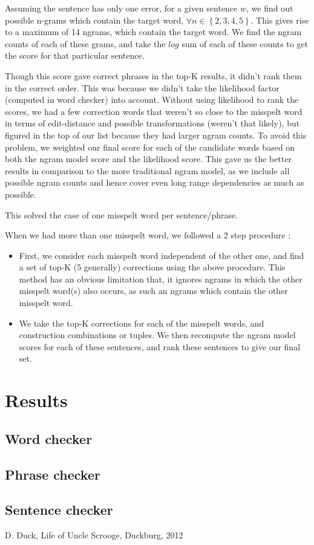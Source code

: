 Assuming the sentence has only one error, for a given sentence $w$, we find out possible n-grams which contain the target word, $\forall n \in \left\lbrace 2,3,4,5 \right\rbrace$. This gives rise to a maximum of 14 ngrams, which contain the target word. We find the ngram counts of each of these grams, and take the $log$ sum of each of these counts to get the score for that particular sentence.



Though this score gave correct phrases in the top-K results, it didn't rank them in the correct order. This was because we didn't take the likelihood factor (computed in word checker) into account. Without using likelihood to rank the scores, we had a few correction words that weren't so close to the misspelt word in terms of edit-distance and possible transformations (weren't that likely), but figured in the top of our list because they had larger ngram counts. To avoid this problem, we weighted our final score for each of the candidate words based on both the ngram model score and the likelihood score. This gave us the better results in comparison to the more traditional ngram model, as we include all possible ngram counts and hence cover even long range dependencies as much as possible.

This solved the case of one misspelt word per sentence/phrase. 

When we had more than one misspelt word, we followed a 2 step procedure :

\begin{itemize}
\item First, we consider each misspelt word independent of the other one, and find a set of top-K (5 generally) corrections using the above procedure. This method has an obvious limitation that, it ignores ngrams in which the other misspelt word(s) also occurs, as such an ngrams which contain the other misspelt word.
\item We take the top-K corrections for each of the misspelt words, and construction combinations or tuples. We then recompute the ngram model scores for each of these sentences, and rank these sentences to give our final set.
\end{itemize}

\section{Results}

\subsection{Word checker}
\subsection{Phrase checker}
\subsection{Sentence checker}

\begin{thebibliography}{9}
 D. Duck, Life of Uncle Scrooge, Duckburg, 2012
\end{thebibliography}


